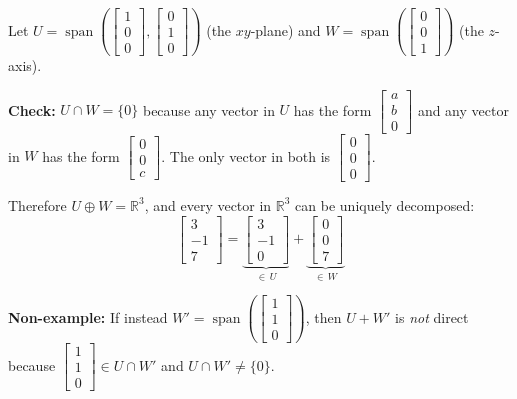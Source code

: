 \documentclass[11pt]{article}
\theoremstyle{definition}
\theoremstyle{plain}
\theoremstyle{remark}
\DeclareMathOperator{\spn}{span}
\begin{document}
\begin{workedexample}[title=\textbf{Worked Example: Direct sum in $\mathbb{R}^3$}]
Let $U = \spn\!\left(\begin{bmatrix}1\\0\\0\end{bmatrix}, \begin{bmatrix}0\\1\\0\end{bmatrix}\right)$ (the $xy$-plane) and $W = \spn\!\left(\begin{bmatrix}0\\0\\1\end{bmatrix}\right)$ (the $z$-axis).

\textbf{Check:} $U \cap W = \{0\}$ because any vector in $U$ has the form $\begin{bmatrix}a\\b\\0\end{bmatrix}$ and any vector in $W$ has the form $\begin{bmatrix}0\\0\\c\end{bmatrix}$. The only vector in both is $\begin{bmatrix}0\\0\\0\end{bmatrix}$.

Therefore $U \oplus W = \mathbb{R}^3$, and every vector in $\mathbb{R}^3$ can be uniquely decomposed:
\[
\begin{bmatrix}3\\-1\\7\end{bmatrix} = \underbrace{\begin{bmatrix}3\\-1\\0\end{bmatrix}}_{\in\, U} + \underbrace{\begin{bmatrix}0\\0\\7\end{bmatrix}}_{\in\, W}
\]

\textbf{Non-example:} If instead $W' = \spn\!\left(\begin{bmatrix}1\\1\\0\end{bmatrix}\right)$, then $U + W'$ is \textit{not} direct because $\begin{bmatrix}1\\1\\0\end{bmatrix} \in U \cap W'$ and $U \cap W' \neq \{0\}$.
\end{workedexample}
\end{document}
